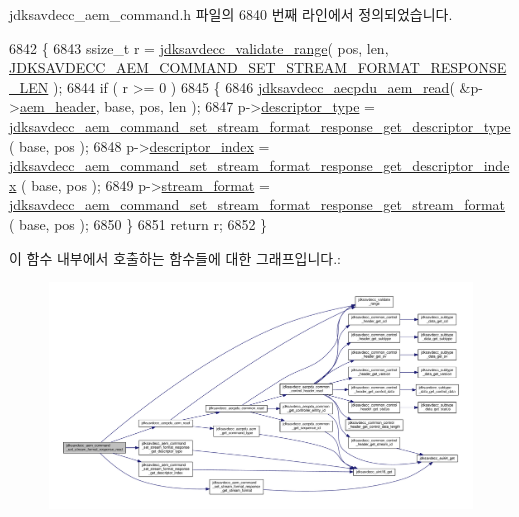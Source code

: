 jdksavdecc\+\_\+aem\+\_\+command.\+h 파일의 6840 번째 라인에서 정의되었습니다.


\begin{DoxyCode}
6842 \{
6843     ssize\_t r = \hyperlink{group__util_ga9c02bdfe76c69163647c3196db7a73a1}{jdksavdecc\_validate\_range}( pos, len, 
      \hyperlink{group__command__set__stream__format__response_ga84ce58cd3f37ceba71eb7fd3db0a5c14}{JDKSAVDECC\_AEM\_COMMAND\_SET\_STREAM\_FORMAT\_RESPONSE\_LEN} 
      );
6844     \textcolor{keywordflow}{if} ( r >= 0 )
6845     \{
6846         \hyperlink{group__aecpdu__aem_gae2421015dcdce745b4f03832e12b4fb6}{jdksavdecc\_aecpdu\_aem\_read}( &p->\hyperlink{structjdksavdecc__aem__command__set__stream__format__response_ae1e77ccb75ff5021ad923221eab38294}{aem\_header}, base, pos, len );
6847         p->\hyperlink{structjdksavdecc__aem__command__set__stream__format__response_ab7c32b6c7131c13d4ea3b7ee2f09b78d}{descriptor\_type} = 
      \hyperlink{group__command__set__stream__format__response_ga236db9fb302ab75ca2403531040254c8}{jdksavdecc\_aem\_command\_set\_stream\_format\_response\_get\_descriptor\_type}
      ( base, pos );
6848         p->\hyperlink{structjdksavdecc__aem__command__set__stream__format__response_a042bbc76d835b82d27c1932431ee38d4}{descriptor\_index} = 
      \hyperlink{group__command__set__stream__format__response_gad537666f50834335936b9c8147d02110}{jdksavdecc\_aem\_command\_set\_stream\_format\_response\_get\_descriptor\_index}
      ( base, pos );
6849         p->\hyperlink{structjdksavdecc__aem__command__set__stream__format__response_a77359be54ea386b1da66597746709ed0}{stream\_format} = 
      \hyperlink{group__command__set__stream__format__response_ga5721fd066a9d109ca693996cf2718dcb}{jdksavdecc\_aem\_command\_set\_stream\_format\_response\_get\_stream\_format}
      ( base, pos );
6850     \}
6851     \textcolor{keywordflow}{return} r;
6852 \}
\end{DoxyCode}


이 함수 내부에서 호출하는 함수들에 대한 그래프입니다.\+:
\nopagebreak
\begin{figure}[H]
\begin{center}
\leavevmode
\includegraphics[width=350pt]{group__command__set__stream__format__response_ga6e89b94300d1d27dc34f6b57fa234690_cgraph}
\end{center}
\end{figure}




